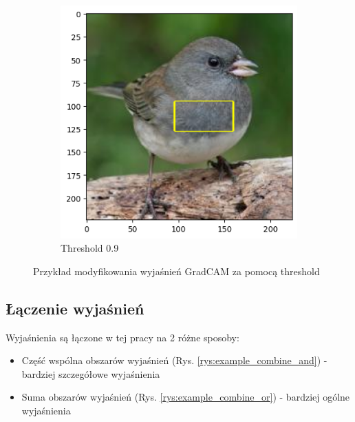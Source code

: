 \begin{figure}[!h]
\begin{subfigure}[b]{0.45\textwidth}
	\end{subfigure}
	\begin{subfigure}[b]{0.45\textwidth}
		\centering\includegraphics[width=.9\textwidth]{img/parameters/gradcam/threshold_09}
		\caption{Threshold 0.9}  \label{rys:parameters_lime_numsamples_1000}
	\end{subfigure}
	\caption{Przykład modyfikowania wyjaśnień GradCAM za pomocą threshold}

\end{figure}

\subsection*{Łączenie wyjaśnień}

Wyjaśnienia są łączone w tej pracy na 2 różne sposoby:
\begin{itemize}
	\item Część wspólna obszarów wyjaśnień (Rys. \ref{rys:example_combine_and}) - bardziej szczegółowe wyjaśnienia
	\item Suma obszarów wyjaśnień (Rys. \ref{rys:example_combine_or}) - bardziej ogólne wyjaśnienia
\end{itemize}

